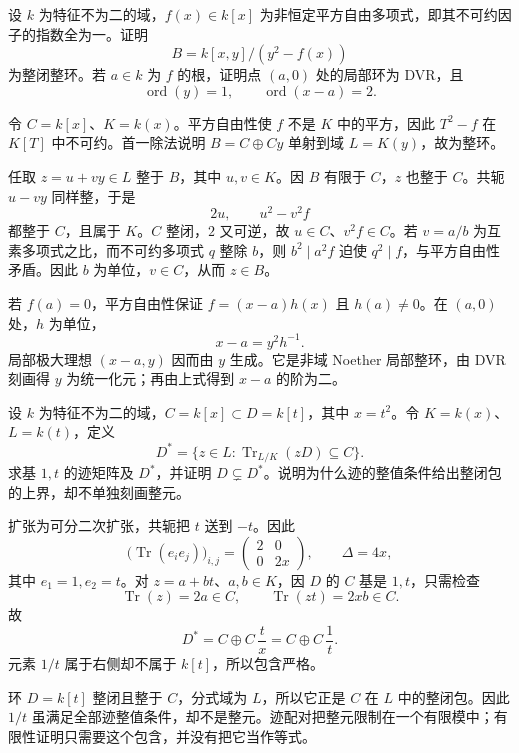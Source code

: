 \begin{exercise}\label{g5:ex:quadratic-squarefree-normal}
	设 \(k\) 为特征不为二的域，\(f(x)\in k[x]\) 为非恒定平方自由多项式，即其不可约因子的指数全为一。证明
	\[
		B=k[x,y]/(y^2-f(x))
	\]
	为整闭整环。若 \(a\in k\) 为 \(f\) 的根，证明点 \((a,0)\) 处的局部环为 DVR，且
	\[
		\operatorname{ord}(y)=1,\qquad
		\operatorname{ord}(x-a)=2.
	\]
\end{exercise}
\begin{solution}
	令 \(C=k[x]\)、\(K=k(x)\)。平方自由性使 \(f\) 不是 \(K\) 中的平方，因此 \(T^2-f\) 在 \(K[T]\) 中不可约。首一除法说明 \(B=C\oplus Cy\) 单射到域 \(L=K(y)\)，故为整环。

	任取 \(z=u+vy\in L\) 整于 \(B\)，其中 \(u,v\in K\)。因 \(B\) 有限于 \(C\)，\(z\) 也整于 \(C\)。共轭 \(u-vy\) 同样整，于是
	\[
		2u,\qquad u^2-v^2f
	\]
	都整于 \(C\)，且属于 \(K\)。\(C\) 整闭，\(2\) 又可逆，故 \(u\in C\)、\(v^2f\in C\)。若 \(v=a/b\) 为互素多项式之比，而不可约多项式 \(q\) 整除 \(b\)，则 \(b^2\mid a^2f\) 迫使 \(q^2\mid f\)，与平方自由性矛盾。因此 \(b\) 为单位，\(v\in C\)，从而 \(z\in B\)。

	若 \(f(a)=0\)，平方自由性保证 \(f=(x-a)h(x)\) 且 \(h(a)\ne0\)。在 \((a,0)\) 处，\(h\) 为单位，
	\[
		x-a=y^2h^{-1}.
	\]
	局部极大理想 \((x-a,y)\) 因而由 \(y\) 生成。它是非域 Noether 局部整环，由 DVR 刻画得 \(y\) 为统一化元；再由上式得到 \(x-a\) 的阶为二。
\end{solution}

\begin{exercise}\label{g5:ex:trace-dual-larger}
	设 \(k\) 为特征不为二的域，\(C=k[x]\subset D=k[t]\)，其中 \(x=t^2\)。令 \(K=k(x)\)、\(L=k(t)\)，定义
	\[
		D^\ast=\{z\in L:\operatorname{Tr}_{L/K}(zD)\subseteq C\}.
	\]
	求基 \(1,t\) 的迹矩阵及 \(D^\ast\)，并证明 \(D\subsetneq D^\ast\)。说明为什么迹的整值条件给出整闭包的上界，却不单独刻画整元。
\end{exercise}
\begin{solution}
	扩张为可分二次扩张，共轭把 \(t\) 送到 \(-t\)。因此
	\[
		\bigl(\operatorname{Tr}(e_ie_j)\bigr)_{i,j}
		=\begin{pmatrix}2&0\\0&2x\end{pmatrix},
		\qquad \Delta=4x,
	\]
	其中 \(e_1=1,e_2=t\)。对 \(z=a+bt\)、\(a,b\in K\)，因 \(D\) 的 \(C\) 基是 \(1,t\)，只需检查
	\[
		\operatorname{Tr}(z)=2a\in C,\qquad
		\operatorname{Tr}(zt)=2xb\in C.
	\]
	故
	\[
		D^\ast=C\oplus C\,\frac{t}{x}=C\oplus C\,\frac1t.
	\]
	元素 \(1/t\) 属于右侧却不属于 \(k[t]\)，所以包含严格。

	环 \(D=k[t]\) 整闭且整于 \(C\)，分式域为 \(L\)，所以它正是 \(C\) 在 \(L\) 中的整闭包。因此 \(1/t\) 虽满足全部迹整值条件，却不是整元。迹配对把整元限制在一个有限模中；有限性证明只需要这个包含，并没有把它当作等式。
\end{solution}


